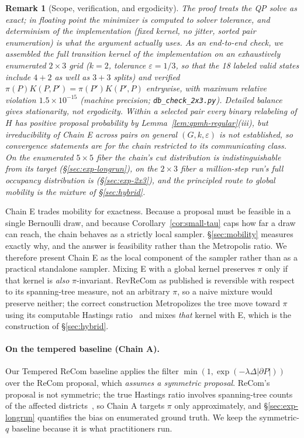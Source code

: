 \documentclass[11pt]{article}
\newtheorem{remark}{Remark}[section]
\begin{document}
\begin{remark}[Scope, verification, and ergodicity]\label{rem:qpmh-scope}
The proof treats the QP solve as exact; in floating point the
minimizer is computed to solver tolerance, and determinism of the
implementation (fixed kernel, no jitter, sorted pair enumeration) is
what the argument actually uses. As an end-to-end check, we assembled
the full transition kernel of the implementation on an exhaustively
enumerated $2 \times 3$ grid ($k = 2$, tolerance $\varepsilon = 1/3$,
so that the 18 labeled valid states include $4{+}2$ as well as
$3{+}3$ splits) and verified
$\pi(P)K(P,P') = \pi(P')K(P',P)$ entrywise, with maximum relative
violation $1.5 \times 10^{-15}$ (machine precision;
\texttt{db\_check\_2x3.py}). Detailed balance
gives stationarity, not ergodicity. Within a selected pair every
binary relabeling of $H$ has positive proposal probability by
Lemma~\ref{lem:qpmh-regular}(iii), but irreducibility of Chain E
across pairs on general $(G, k, \varepsilon)$ is not established, so
convergence statements are for the chain restricted to its
communicating class. On the enumerated $5 \times 5$ fiber the chain's
cut distribution is indistinguishable from its target
(\S\ref{sec:exp-longrun}), on the $2 \times 3$ fiber a million-step
run's full occupancy distribution is (\S\ref{sec:exp-2x3}), and the
principled route to global mobility is the mixture of
\S\ref{sec:hybrid}.
\end{remark}

Chain E trades mobility for exactness. Because a proposal must be
feasible in a single Bernoulli draw, and because
Corollary~\ref{cor:small-tau} caps how far a draw can reach, the
chain behaves as a strictly local sampler. \S\ref{sec:mobility}
measures exactly why, and the answer is feasibility rather than the
Metropolis ratio. We therefore present Chain E as the local component
of the sampler rather than as a practical standalone sampler. Mixing
E with a global kernel preserves $\pi$ only if that kernel is
\emph{also} $\pi$-invariant. RevReCom as published is reversible with
respect to its spanning-tree measure, not an arbitrary $\pi$, so a
naive mixture would preserve neither; the correct construction
Metropolizes the tree move toward $\pi$ using its computable Hastings
ratio~\cite{cannon2022spanning,autry2023metropolized} and mixes
\emph{that} kernel with E, which is the construction of
\S\ref{sec:hybrid}.

\paragraph{On the tempered baseline (Chain A).} \sloppy Our Tempered ReCom
baseline applies the filter $\min(1, \exp(-\lambda \Delta|\partial P|))$
over the ReCom proposal, which \emph{assumes a symmetric proposal}.
ReCom's proposal is not symmetric; the true Hastings ratio involves
spanning-tree counts of the affected
districts~\cite{autry2023metropolized,cannon2022spanning}, so Chain A
targets $\pi$ only approximately, and \S\ref{sec:exp-longrun}
quantifies the bias on enumerated ground truth. We keep the
symmetric-$q$ baseline because it is what practitioners run.
\end{document}
